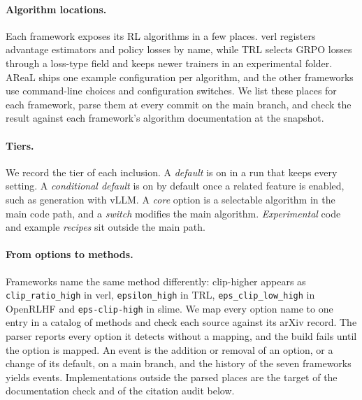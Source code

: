 \documentclass{article}
\begin{document}
\paragraph{Algorithm locations.} Each framework exposes its RL algorithms in a few places. verl registers advantage estimators and policy losses by name, while TRL selects GRPO losses through a loss-type field and keeps newer trainers in an experimental folder. AReaL ships one example configuration per algorithm, and the other frameworks use command-line choices and configuration switches. We list these places for each framework, parse them at every commit on the main branch, and check the result against each framework's algorithm documentation at the snapshot.

\paragraph{Tiers.} We record the tier of each inclusion. A \emph{default} is on in a run that keeps every setting. A \emph{conditional default} is on by default once a related feature is enabled, such as generation with vLLM. A \emph{core} option is a selectable algorithm in the main code path, and a \emph{switch} modifies the main algorithm. \emph{Experimental} code and example \emph{recipes} sit outside the main path.

\paragraph{From options to methods.} Frameworks name the same method differently: clip-higher \citep{arxiv250314476} appears as \texttt{clip\_ratio\_high} in verl, \texttt{epsilon\_high} in TRL, \texttt{eps\_clip\_low\_high} in OpenRLHF and \texttt{eps-clip-high} in slime. We map every option name to one entry in a catalog of \NCatalog{} methods and check each source against its arXiv record. The parser reports every option it detects without a mapping, and the build fails until the option is mapped. An event is the addition or removal of an option, or a change of its default, on a main branch, and the history of the seven frameworks yields \NEvents{} events. Implementations outside the parsed places are the target of the documentation check and of the citation audit below.
\end{document}
